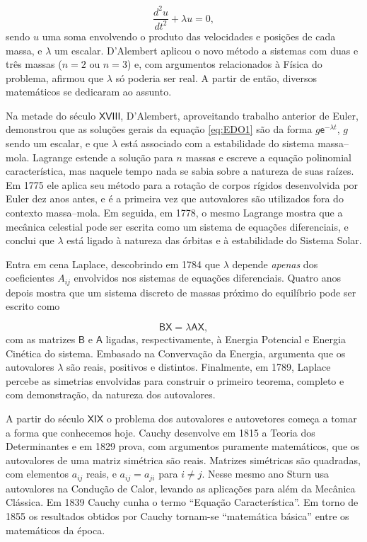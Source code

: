 \begin{equation}\label{eq:EDO1}
	\frac{d^2u}{dt^2} + \lambda u = 0,
\end{equation}
sendo $u$ uma soma envolvendo o produto das velocidades e posições de cada massa, e $\lambda$ um escalar. D'Alembert aplicou o novo método a sistemas com duas e três massas ($n = 2$ ou $n = 3$) e, com argumentos relacionados à Física do problema, afirmou que $\lambda$ só poderia ser real. A partir de então, diversos matemáticos se dedicaram ao assunto.

	Na metade do século $\mathsf{XVIII}$, D'Alembert, aproveitando trabalho anterior de Euler, demonstrou que as soluções gerais da equação \ref{eq:EDO1} são da forma $g\mathsf{e}^{-\lambda t}$, $g$ sendo um escalar, e que $\lambda$ está associado com a estabilidade do sistema massa--mola. Lagrange estende a solução para $n$ massas e escreve a equação polinomial característica, mas naquele tempo nada se sabia sobre a natureza de suas raízes. Em 1775 ele aplica seu método para a rotação de corpos rígidos desenvolvida por Euler dez anos antes, e é a primeira vez que autovalores são utilizados fora do contexto massa--mola. Em seguida, em 1778, o mesmo Lagrange mostra que a mecânica celestial pode ser escrita como um sistema de equações diferenciais, e conclui que $\lambda$ está ligado à natureza das órbitas e à estabilidade do Sistema Solar.
	
	Entra em cena Laplace, descobrindo em 1784 que $\lambda$ depende \emph{apenas} dos coeficientes $A_{ij}$ envolvidos nos sistemas de equações diferenciais. Quatro anos depois mostra que um sistema discreto de massas próximo do equilíbrio pode ser escrito como 
	
	\begin{equation}
		\mathsf{B}\mathsf{X} = \lambda \mathsf{A}\mathsf{X},
	\end{equation}
	com as matrizes $\mathsf{B}$ e $\mathsf{A}$ ligadas, respectivamente, à Energia Potencial e Energia Cinética do sistema. Embasado na Convervação da Energia, argumenta que os autovalores $\lambda$ são reais, positivos e distintos. Finalmente, em 1789, Laplace percebe as simetrias envolvidas para construir o primeiro teorema, completo e com demonstração, da natureza dos autovalores.
	
	A partir do século $\mathsf{XIX}$ o problema dos autovalores e autovetores começa a tomar a forma que conhecemos hoje. Cauchy desenvolve em 1815 a Teoria dos Determinantes e em 1829 prova, com argumentos puramente matemáticos, que os autovalores de uma matriz simétrica são reais. Matrizes simétricas são quadradas, com elementos $a_{ij}$ reais, e $a_{ij} = a_{ji}$ para $i \neq j$. Nesse mesmo ano Sturn usa autovalores na Condução de Calor, levando as aplicações para além da Mecânica Clássica. Em 1839 Cauchy cunha o termo ``Equação Característica''. Em torno de 1855 os resultados obtidos por Cauchy tornam-se ``matemática básica'' entre os matemáticos da época.
	
